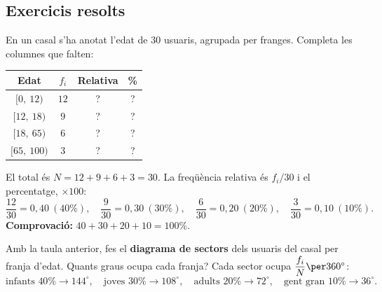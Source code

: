 \subsection{Exercicis resolts}

\begin{exresolt}
En un casal s'ha anotat l'edat de $30$ usuaris, agrupada per franges. Completa les
columnes que falten:

\begin{center}
\begin{tabular}{c c c c}
\toprule
\textbf{Edat} & $f_i$ & \textbf{Relativa} & \textbf{\%} \\
\midrule
$[0,\ 12)$ & $12$ & ? & ? \\
$[12,\ 18)$ & $9$ & ? & ? \\
$[18,\ 65)$ & $6$ & ? & ? \\
$[65,\ 100)$ & $3$ & ? & ? \\
\bottomrule
\end{tabular}
\end{center}
\solucio
El total és $N=12+9+6+3=30$. La freqüència relativa és $f_i/30$ i el percentatge,
$\times 100$:
\[
\frac{12}{30}=0,40\ (40\%),\quad
\frac{9}{30}=0,30\ (30\%),\quad
\frac{6}{30}=0,20\ (20\%),\quad
\frac{3}{30}=0,10\ (10\%).
\]
\textbf{Comprovació:} $40+30+20+10=100\%$.
\end{exresolt}

\begin{exresolt}
Amb la taula anterior, fes el \textbf{diagrama de sectors} dels usuaris del casal per
franja d'edat. Quants graus ocupa cada franja?
\solucio
Cada sector ocupa $\dfrac{f_i}{N}\per 360^\circ$:
\[
\text{infants } 40\%\to 144^\circ,\quad
\text{joves } 30\%\to 108^\circ,\quad
\text{adults } 20\%\to 72^\circ,\quad
\text{gent gran } 10\%\to 36^\circ.
\]
\begin{center}

\end{center}
\end{exresolt}

